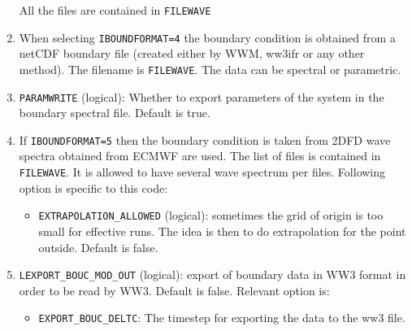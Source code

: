 \documentclass[12pt]{amsart}
\begin{document}
\begin{enumerate}
\begin{itemize}
  \end{itemize}
  All the files are contained in {\tt FILEWAVE}
\item When selecting {\tt IBOUNDFORMAT=4} the boundary condition is obtained from a netCDF boundary file (created either by WWM, ww3ifr or any other method). The filename is {\tt FILEWAVE}. The data can be spectral or parametric.
\item {\tt PARAMWRITE} (logical): Whether to export parameters of the system in the boundary spectral file. Default is true.
\item If {\tt IBOUNDFORMAT=5} then the boundary condition is taken from 2DFD wave spectra obtained from ECMWF are used. The list of files is contained in {\tt FILEWAVE}. It is allowed to have several wave spectrum per files. Following option is specific to this code:
  \begin{itemize}
  \item {\tt EXTRAPOLATION\_ALLOWED} (logical): sometimes the grid of origin is too small for effective runs. The idea is then to do extrapolation for the point outside. Default is false.
  
  \end{itemize}
\item {\tt LEXPORT\_BOUC\_MOD\_OUT} (logical): export of boundary data in WW3 format in order to be read by WW3. Default is false. Relevant option is:
  \begin{itemize}
  \item {\tt EXPORT\_BOUC\_DELTC}: The timestep for exporting the data to the ww3 file.
  \end{itemize}
  

\end{enumerate}



\newpage
\end{document}

